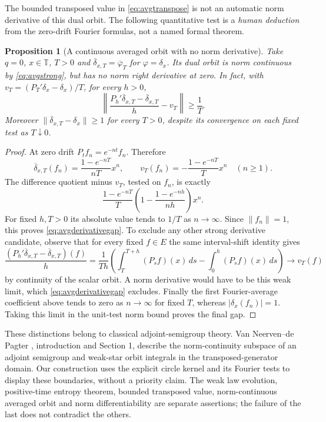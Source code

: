 \documentclass[11pt]{article}
\newtheorem{proposition}[theorem]{Proposition}
\newcommand{\T}{\mathbb T}\newcommand{\D}{\mathbb D}
\begin{document}
The bounded transposed value in \eqref{eq:avgtranspose} is not an
automatic norm derivative of this dual orbit. The following quantitative
test is a \emph{human deduction} from the zero-drift Fourier formulas,
not a named formal theorem.
\begin{proposition}[A continuous averaged orbit with no norm derivative]
Take $q=0$, $x\in\T$, $T>0$ and
$\overline\delta_{x,T}=\overline\varphi_T$ for $\varphi=\delta_x$.
Its dual orbit is norm continuous by \eqref{eq:avgstrong}, but has no
norm right derivative at zero. In fact, with
$v_T=(P_T'\delta_x-\delta_x)/T$, for every $h>0$,
\begin{equation}\label{eq:avgderivativegap}
 \left\|\frac{P_h'\overline\delta_{x,T}-\overline\delta_{x,T}}h-v_T\right\|
      \geq\frac1T.
\end{equation}
Moreover $\|\overline\delta_{x,T}-\delta_x\|\geq1$ for every $T>0$,
despite its convergence on each fixed test as $T\downarrow0$.
\end{proposition}
\begin{proof}
At zero drift $P_tf_n=e^{-nt}f_n$. Therefore
\[
 \overline\delta_{x,T}(f_n)=\frac{1-e^{-nT}}{nT}x^n,
 \qquad v_T(f_n)=-\frac{1-e^{-nT}}T x^n\quad(n\geq1).
\]
The difference quotient minus $v_T$, tested on $f_n$, is exactly
\[
 \frac{1-e^{-nT}}T
       \left(1-\frac{1-e^{-nh}}{nh}\right)x^n.
\]
For fixed $h,T>0$ its absolute value tends to $1/T$ as $n\to\infty$.
Since $\|f_n\|=1$, this proves \eqref{eq:avgderivativegap}.
To exclude any other strong derivative candidate, observe that for
every fixed $f\in E$ the same interval-shift identity gives
\[
 \frac{(P_h'\overline\delta_{x,T}-\overline\delta_{x,T})(f)}h
 =\frac1{Th}\left(\int_T^{T+h}(P_sf)(x)\,ds
                       -\int_0^h(P_sf)(x)\,ds\right)
       \longrightarrow v_T(f)
\]
by continuity of the scalar orbit. A norm derivative would have to
be this weak limit, which \eqref{eq:avgderivativegap} excludes.
Finally the first Fourier-average coefficient above tends to zero
as $n\to\infty$ for fixed $T$, whereas $|\delta_x(f_n)|=1$.
Taking this limit in the unit-test norm bound proves the final gap.
\end{proof}

These distinctions belong to classical adjoint-semigroup theory.
Van Neerven--de Pagter \cite{adjoint}, introduction and Section 1,
describe the norm-continuity subspace of an adjoint semigroup and
weak-star orbit integrals in the transposed-generator domain. Our
construction uses the explicit circle kernel and its Fourier tests
to display these boundaries, without a priority claim. The weak law
evolution, positive-time entropy theorem, bounded transposed value,
norm-continuous averaged orbit and norm differentiability are separate
assertions; the failure of the last does not contradict the others.
\end{document}
